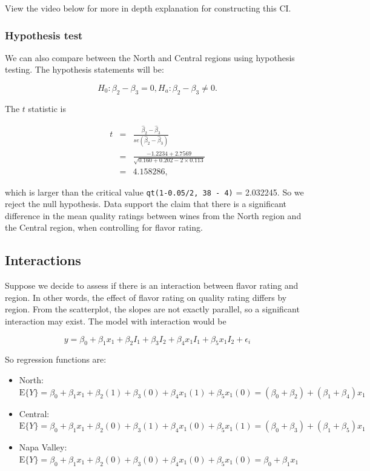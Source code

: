 \documentclass[
]{book}
\begin{document}
View the video below for more in depth explanation for constructing this CI.

\hypertarget{hypothesis-test}{%
\subsubsection{Hypothesis test}\label{hypothesis-test}}

We can also compare between the North and Central regions using hypothesis testing. The hypothesis statements will be:

\[
H_0: \beta_2 - \beta_3 = 0, H_a: \beta_2 - \beta_3 \neq 0.
\]

The \(t\) statistic is

\begin{eqnarray*}
t &=& \frac{\hat{\beta}_2 - \hat{\beta}_3}{se\left(\hat{\beta}_2-\hat{\beta}_3\right)}\nonumber \\
  &=& \frac{-1.2234 + 2.7569}{\sqrt{0.160 + 0.202 - 2 \times 0.113}} \nonumber \\
  &=& 4.158286,
\end{eqnarray*}

which is larger than the critical value \texttt{qt(1-0.05/2,\ 38\ -\ 4)} = 2.032245. So we reject the null hypothesis. Data support the claim that there is a significant difference in the mean quality ratings between wines from the North region and the Central region, when controlling for flavor rating.

\hypertarget{interactions}{%
\subsection{Interactions}\label{interactions}}

Suppose we decide to assess if there is an interaction between flavor rating and region. In other words, the effect of flavor rating on quality rating differs by region. From the scatterplot, the slopes are not exactly parallel, so a significant interaction may exist. The model with interaction would be

\begin{equation*}
y = \beta_0 + \beta_1x_{1} + \beta_2I_{1} + \beta_3I_{2} + \beta_4 x_1 I_{1} + \beta_5 x_1 I_{2} + \epsilon_i
\end{equation*}

So regression functions are:

\begin{itemize}
\item
  North: \(\mbox{E}\{Y\} = \beta_0 + \beta_1x_1 + \beta_2(1) + \beta_3(0) + \beta_4x_1(1) + \beta_5x_1(0) = (\beta_0+\beta_2) + (\beta_1 + \beta_4)x_1\)
\item
  Central: \(\mbox{E}\{Y\} = \beta_0 + \beta_1x_1 + \beta_2(0) + \beta_3(1) + \beta_4x_1(0) + \beta_5x_1(1) = (\beta_0+\beta_3) + (\beta_1 + \beta_5)x_1\)
\item
  Napa Valley: \(\mbox{E}\{Y\} = \beta_0 + \beta_1x_1 + \beta_2(0) + \beta_3(0) + \beta_4x_1(0) + \beta_5x_1(0) =\beta_0 + \beta_1x_1\)
\end{itemize}
\end{document}
